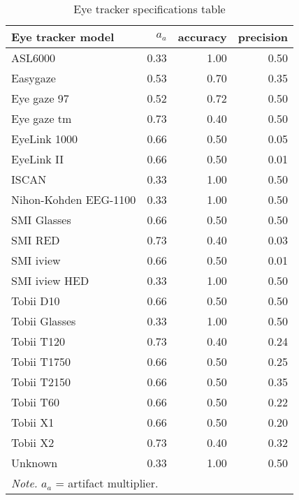 \begin{table}[ht]
\centering
\caption{Eye tracker specifications table} 
\label{tab:eyetracker_specifications}
\begin{tabular}{lrrr}
  \hline
Eye tracker model & $a_a$ & accuracy & precision \\ 
  \hline
ASL6000 & 0.33 & 1.00 & 0.50 \\ 
  Easygaze & 0.53 & 0.70 & 0.35 \\ 
  Eye gaze 97 & 0.52 & 0.72 & 0.50 \\ 
  Eye gaze tm & 0.73 & 0.40 & 0.50 \\ 
  EyeLink 1000 & 0.66 & 0.50 & 0.05 \\ 
  EyeLink II & 0.66 & 0.50 & 0.01 \\ 
  ISCAN & 0.33 & 1.00 & 0.50 \\ 
  Nihon-Kohden EEG-1100 & 0.33 & 1.00 & 0.50 \\ 
  SMI Glasses & 0.66 & 0.50 & 0.50 \\ 
  SMI RED & 0.73 & 0.40 & 0.03 \\ 
  SMI iview & 0.66 & 0.50 & 0.01 \\ 
  SMI iview HED & 0.33 & 1.00 & 0.50 \\ 
  Tobii D10 & 0.66 & 0.50 & 0.50 \\ 
  Tobii Glasses & 0.33 & 1.00 & 0.50 \\ 
  Tobii T120 & 0.73 & 0.40 & 0.24 \\ 
  Tobii T1750 & 0.66 & 0.50 & 0.25 \\ 
  Tobii T2150 & 0.66 & 0.50 & 0.35 \\ 
  Tobii T60 & 0.66 & 0.50 & 0.22 \\ 
  Tobii X1 & 0.66 & 0.50 & 0.20 \\ 
  Tobii X2 & 0.73 & 0.40 & 0.32 \\ 
  Unknown & 0.33 & 1.00 & 0.50 \\ 
   \hline 
 \multicolumn{4}{l}{\scriptsize{\textit{Note.} $a_a$ = artifact multiplier.}} 
\end{tabular}
\end{table}
